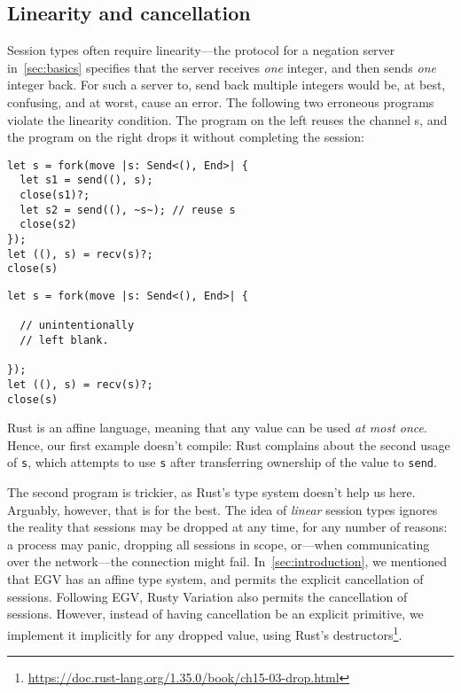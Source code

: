 \documentclass[copyright,creativecommons]{eptcs}
\begin{document}
\subsection{Linearity and cancellation}\label{sec:cancellation}
Session types often require linearity---the protocol for a negation server in~\cref{sec:basics} specifies that the server receives \emph{one} integer, and then sends \emph{one} integer back. For such a server to, \eg send back multiple integers would be, at best, confusing, and at worst, cause an error. The following two erroneous programs violate the linearity condition. The program on the left reuses the channel s, and the program on the right drops it without completing the session:

\vspace{-0.5\baselineskip}
\begin{minipage}[t]{0.5\linewidth}
\begin{lstlisting}
let s = fork(move |s: Send<(), End>| {
  let s1 = send((), s);
  close(s1)?;
  let s2 = send((), ~s~); // reuse s
  close(s2)
});
let ((), s) = recv(s)?;
close(s)
\end{lstlisting}
\end{minipage}%
\begin{minipage}[t]{0.5\linewidth}
\begin{lstlisting}
let s = fork(move |s: Send<(), End>| {
  
  // unintentionally
  // left blank.

});
let ((), s) = recv(s)?;
close(s)
\end{lstlisting}
\end{minipage}

\noindent
Rust is an affine language, meaning that any value can be used \emph{at most once}. Hence, our first example doesn't compile: Rust complains about the second usage of \lstinline{s}, which attempts to use \lstinline{s} after transferring ownership of the value to \lstinline{send}.

The second program is trickier, as Rust's type system doesn't help us here. Arguably, however, that is for the best. The idea of \emph{linear} session types ignores the reality that sessions may be dropped at any time, for any number of reasons: a process may panic, dropping all sessions in scope, or---when communicating over the network---the connection might fail. In~\cref{sec:introduction}, we mentioned that EGV has an affine type system, and permits the explicit cancellation of sessions. Following EGV, Rusty Variation also permits the cancellation of sessions. However, instead of having cancellation be an explicit primitive, we implement it implicitly for any dropped value, using Rust's destructors\footnote{\url{https://doc.rust-lang.org/1.35.0/book/ch15-03-drop.html}}.
\end{document}
